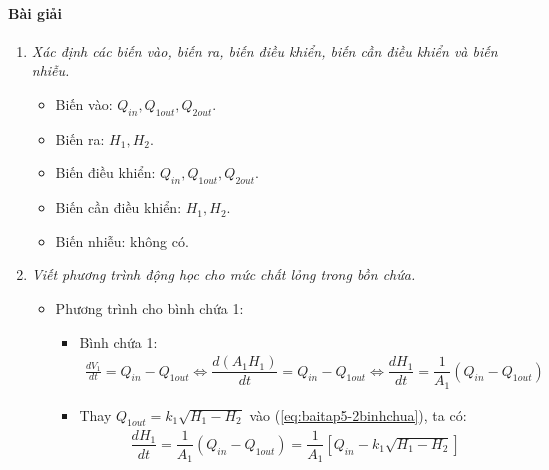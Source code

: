     \paragraph{Bài giải}
        \begin{enumerate}[\it a.]
            \item \textit{Xác định các biến vào, biến ra, biến điều khiển, biến cần điều khiển và biến nhiễu.}
                \begin{itemize}
                    \item Biến vào: $Q_{in}, Q_{1out}, Q_{2out}$.
                    \item Biến ra: $H_1, H_2$.
                    \item Biến điều khiển: $Q_{in}, Q_{1out}, Q_{2out}$.
                    \item Biến cần điều khiển: $H_1, H_2$.
                    \item Biến nhiễu: không có.
                \end{itemize}

            \item \textit{Viết phương trình động học cho mức chất lỏng trong bồn chứa.}
                \begin{itemize}
                    \item Phương trình cho bình chứa 1:
                        \begin{itemize}
                            \item Bình chứa 1:
                                \begin{align} \label{eq:baitap5-2binhchua}
                                    \frac{dV_1}{dt} = Q_{in} - Q_{1out} \Longleftrightarrow \dfrac{d\left({A_1 H_1}\right)}{dt} = Q_{in} - Q_{1out} \Longleftrightarrow \dfrac{dH_1}{dt} = \dfrac{1}{A_1} \left({Q_{in} - Q_{1out}}\right)
                                \end{align}

                            \item Thay $Q_{1out} = k_1 \sqrt{H_1 - H_2}$ vào (\ref{eq:baitap5-2binhchua}), ta có:
                                \begin{align}
                                    \dfrac{dH_1}{dt} = \dfrac{1}{A_1} \left({Q_{in} - Q_{1out}}\right) = \dfrac{1}{A_1} \left[{Q_{in} - k_1 \sqrt{H_1 - H_2}}\right]
                                \end{align}
                        \end{itemize}


\end{itemize}
\end{enumerate}
